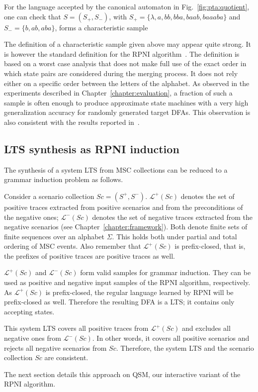 For the language accepted by the canonical automaton in Fig.~\ref{fig:pta:quotient}, one can check that $S = (S_+, S_-)$, with $S_+ = \{\lambda, a, bb, bba, baab, baaaba\}$ and $S_- = \{b, ab, aba\}$, forms a characteristic sample 

The definition of a characteristic sample given above may appear quite strong. It is however the standard definition for the RPNI algorithm~\cite{Oncina:1992,Dupont:1996b}. The definition is based on a worst case analysis that does not make full use of the exact order in which state pairs are considered during the merging process. It does not rely either on a specific order between the letters of the alphabet. As observed in the experiments described in Chapter~\ref{chapter:evaluation}, a fraction of such a sample is often enough to produce approximate state machines with a very high generalization accuracy for randomly generated target DFAs. This observation is also consistent with the results reported in~\cite{Lang:1998}.

\subsection{LTS synthesis as RPNI induction\label{subsection:inductive-lts-synthesis-reduction}}

The synthesis of a system LTS from MSC collections can be reduced to a grammar induction problem as follows. 

Consider a scenario collection $Sc = (S^+, S^-)$. $\mathcal{L}^+(Sc)$ denotes the set of positive traces extracted from positive scenarios and from the preconditions of the negative ones; $\mathcal{L}^-(Sc)$ denotes the set of negative traces extracted from the negative scenarios (see Chapter~\ref{chapter:framework}). Both denote finite sets of finite sequences over an alphabet $\Sigma$. This holds both under partial and total ordering of MSC events. Also remember that $\mathcal{L}^+(Sc)$ is prefix-closed, that is, the prefixes of positive traces are positive traces as well.

$\mathcal{L}^+(Sc)$ and $\mathcal{L}^-(Sc)$ form valid samples for grammar induction. They can be used as positive and negative input samples of the RPNI algorithm, respectively. As $\mathcal{L}^+(Sc)$ is prefix-closed, the regular language learned by RPNI will be prefix-closed as well. Therefore the resulting DFA is a LTS; it contains only accepting states. 

This system LTS covers all positive traces from $\mathcal{L}^+(Sc)$ and excludes all negative ones from $\mathcal{L}^-(Sc)$. In other words, it covers all positive scenarios and rejects all negative scenarios from $Sc$. Therefore, the system LTS and the scenario collection $Sc$ are consistent.

The next section details this approach on QSM, our interactive variant of the RPNI algorithm. 

